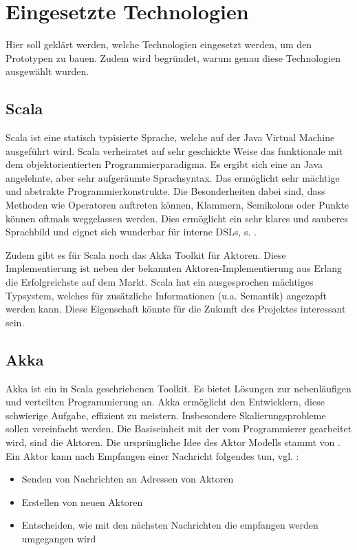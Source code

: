  
\section{Eingesetzte Technologien}\label{}
 
Hier soll geklärt werden, welche Technologien eingesetzt werden, um den Prototypen zu bauen. Zudem wird begründet, warum genau diese Technologien ausgewählt wurden.

 
\subsection{Scala}\label{}
 
Scala ist eine statisch typisierte Sprache, welche auf der Java Virtual Machine ausgeführt wird. Scala verheiratet auf sehr geschickte Weise das funktionale mit dem objektorientierten Programmierparadigma. Es ergibt sich eine an Java angelehnte, aber sehr aufgeräumte Sprachsyntax. Das ermöglicht sehr mächtige und abstrakte Programmierkonstrukte. Die Besonderheiten dabei sind, dass Methoden wie Operatoren auftreten können, Klammern, Semikolons oder Punkte können oftmals weggelassen werden. Dies ermöglicht ein sehr klares und sauberes Sprachbild und eignet sich wunderbar für interne DSLs, s. \citep{Hodapp}.

 
Zudem gibt es für Scala noch das Akka Toolkit für Aktoren. Diese Implementierung ist neben der bekannten Aktoren-Implementierung aus Erlang die Erfolgreichste auf dem Markt. Scala hat ein ausgesprochen mächtiges Typsystem, welches für zusätzliche Informationen (u.a. Semantik) angezapft werden kann. Diese Eigenschaft könnte für die Zukunft des Projektes interessant sein.

 
\subsection{Akka}\label{}
 
Akka ist ein in Scala geschriebenen Toolkit. Es bietet Lösungen zur nebenläufigen und verteilten Programmierung an. Akka ermöglicht den Entwicklern, diese schwierige Aufgabe, effizient zu meistern. Insbesondere Skalierungsprobleme sollen vereinfacht werden. Die Basiseinheit mit der vom Programmierer gearbeitet wird, sind die Aktoren. Die ursprüngliche Idee des Aktor Modells stammt von \citep{Hewitt}. Ein Aktor kann nach Empfangen einer Nachricht folgendes tun, vgl. \citep{Hewitt2}:

 
\begin{itemize}

\item Senden von Nachrichten an Adressen von Aktoren
\item Erstellen von neuen Aktoren
\item Entscheiden, wie mit den nächsten Nachrichten die empfangen werden umgegangen wird
\end{itemize}
 
